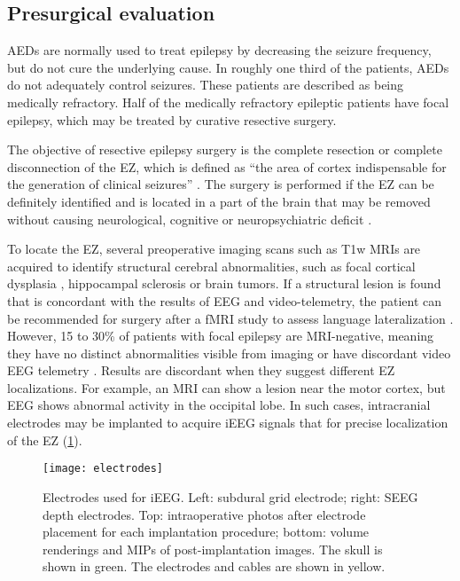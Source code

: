 \subsection{Presurgical evaluation}

\Acp{AED} are normally used to treat epilepsy by decreasing the seizure frequency, but do not cure the underlying cause.
In roughly one third of the patients, \acp{AED} do not adequately control seizures.
These patients are described as being medically refractory.
Half of the medically refractory epileptic patients have focal epilepsy, which may be treated by curative resective surgery.

The objective of resective epilepsy surgery is the complete resection or complete disconnection of the \ac{EZ}, which is defined as ``the area of cortex indispensable for the generation of clinical seizures'' \cite{rosenow_presurgical_2001}.
The surgery is performed if the \ac{EZ} can be definitely identified and is located in a part of the brain that may be removed without causing neurological, cognitive or neuropsychiatric deficit \cite{jobst_resective_2015}.

To locate the \ac{EZ}, several preoperative imaging scans such as \ac{T1w} \acp{MRI} are acquired to identify structural cerebral abnormalities, such as focal cortical dysplasia \cite{kabat_focal_2012}, hippocampal sclerosis \cite{thom_review_2014} or brain tumors.
If a structural lesion is found that is concordant with the results of \ac{EEG} and video-telemetry, the patient can be recommended for surgery after a \ac{fMRI} study to assess language lateralization \cite{duncan_brain_2016}.
However, 15 to 30\% of patients with focal epilepsy are \ac{MRI}-negative, meaning they have no distinct abnormalities visible from imaging or have discordant video \ac{EEG} telemetry \cite{bien_characteristics_2009}.
Results are discordant when they suggest different \ac{EZ} localizations.
For example, an \ac{MRI} can show a lesion near the motor cortex, but \ac{EEG} shows abnormal activity in the occipital lobe.
In such cases, intracranial electrodes may be implanted to acquire \ac{iEEG} signals that for precise localization of the \ac{EZ} (\cref{fig:electrodes}).

\begin{figure}[hbt!]
  \centering
  \texttt{[image: electrodes]}
  \caption[Electrodes used for intracranial EEG]{
    Electrodes used for \ac{iEEG}.
    Left: subdural grid electrode;
    right: \ac{SEEG} depth electrodes.
    Top: intraoperative photos after electrode placement for each implantation procedure;
    bottom: volume renderings and \acp{MIP} of post-implantation images.
    The skull is shown in green.
    The electrodes and cables are shown in yellow.
  }\label{fig:electrodes}
\end{figure}

